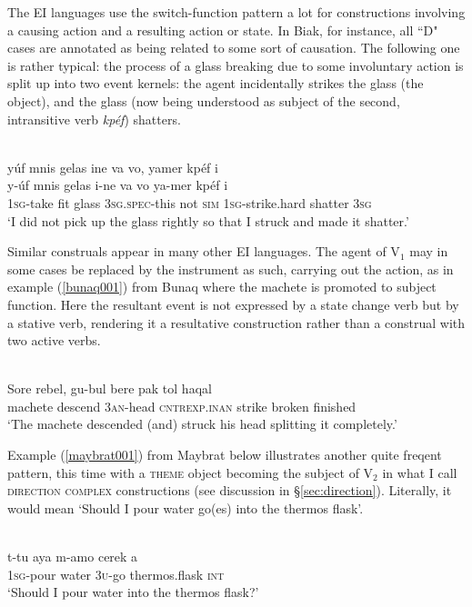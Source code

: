 The EI languages use the switch-function pattern a lot for constructions involving a causing action and a resulting action or state. In Biak, for instance, all ``D" cases are annotated as being related to some sort of causation. The following one is rather typical: the process of a glass breaking due to some involuntary action is split up into two event kernels: the agent incidentally strikes the glass (the object), and the glass (now being understood as subject of the second, intransitive verb \textit{kpéf}) shatters.

\ea \label{}
\\
\glll yúf mnis gelas ine va vo, yamer kpéf i \\
y-úf mnis gelas i-ne va vo ya-mer kpéf i \\
1\textsc{sg}-take fit glass 3\textsc{sg}.\textsc{spec}-this not \textsc{sim} 1\textsc{sg}-strike.hard shatter 3\textsc{sg} \\
\glft `I did not pick up the glass rightly so that I struck and made it shatter.'\\ 
\z

Similar construals appear in many other EI languages. The agent of V$_1$ may in some cases be replaced by the instrument as such, carrying out the action, as in example (\ref{bunaq001}) from Bunaq where the machete is promoted to subject function. Here the resultant event is not expressed by a state change verb but by a stative verb, rendering it a resultative construction rather than a construal with two active verbs.

\ea \label{bunaq001}
\\
\gll Sore rebel, gu-bul bere pak tol haqal \\
machete descend 3\textsc{an}-head \textsc{cntrexp}.\textsc{inan} strike broken finished \\
\glft `The machete descended (and) struck his head splitting it completely.’\\ 
\z

Example (\ref{maybrat001}) from Maybrat below illustrates another quite freqent pattern, this time with a \textsc{theme} object becoming the subject of V$_2$ in what I call \textsc{direction complex} constructions (see discussion in §\ref{sec:direction}). Literally, it would mean `Should I pour water go(es) into the thermos flask'.

\ea \label{maybrat001}
\\
\gll t-tu aya m-amo cerek a \\
1\textsc{sg}-pour water 3\textsc{u}-go thermos.flask \textsc{int} \\
\glft `Should I pour water into the thermos flask?'\\ 
\z

